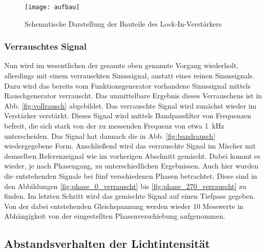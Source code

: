 \begin{figure}
  \centering
  \texttt{[image: aufbau]}
  \caption{Schematische Darstellung der Bauteile des
    Lock-In-Verstärkers}
  \label{fig:aufbau}
\end{figure}

\subsubsection{Verrauschtes Signal}

Nun wird im wesentlichen der gesamte oben genannte Vorgang wiederholt,
allerdings mit einem verrauschten Sinussignal, anstatt eines reinen
Sinussignals. Dazu wird das bereits vom Funktionsgenerator vorhandene
Sinussignal mittels Rauschgenerator verrauscht. Das unmittelbare
Ergebnis dieses Verrauschens ist in Abb. \ref{fig:vollrausch}
abgebildet. Das verrauschte Signal wird zunächst wieder im Verstärker
verstärkt. Dieses Signal wird mittels Bandpassfilter von Frequenzen
befreit, die sich stark von der zu messenden Frequenz von etwa
\SI{1}{\kilo\hertz} unterscheiden. Das Signal hat dannach die in
Abb. \ref{fig:bandrausch} wiedergegebene Form. Anschließend wird das
verrauschte Signal im Mischer mit demselben Referenzsignal wie im
vorherigen Abschnitt gemischt. Dabei kommt es wieder, je nach
Phasengang, zu unterschiedlichen Ergebnissen. Auch hier wurden die
entstehenden Signale bei fünf verschiedenen Phasen betrachtet. Diese
sind in den Abbildungen \ref{fig:phase_0_verrauscht} bis
\ref{fig:phase_270_verrauscht} zu finden.  Im letzten Schritt wird das
gemischte Signal auf einen Tiefpass gegeben. Von der dabei entstehenden
Gleichspannung werden wieder 10 Messwerte in Abhängigkeit von der
eingestellten Phasenverschiebung aufgenommen.

\subsection{Abstandsverhalten der Lichtintensität}

